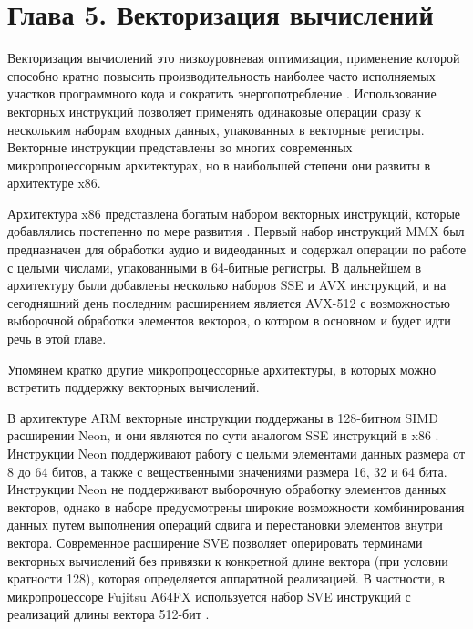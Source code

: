 \newpage
\section*{Глава 5. Векторизация вычислений} %
\addtocounter{section}{1}                                                    %
\setcounter{subsection}{0}
\setcounter{figure}{0}
\setcounter{equation}{0}
\setcounter{table}{0}
\setcounter{theorem}{0}
\setcounter{lemma}{0}
\setcounter{definition}{0}

Векторизация вычислений это низкоуровневая оптимизация, применение которой способно кратно повысить производительность наиболее часто исполняемых участков программного кода и сократить энергопотребление \cite{Cebrian2019VecScal}.
Использование векторных инструкций позволяет применять одинаковые операции сразу к нескольким наборам входных данных, упакованных в векторные регистры.
Векторные инструкции представлены во многих современных микропроцессорным архитектурах, но в наибольшей степени они развиты в архитектуре x86.

Архитектура x86 представлена богатым набором векторных инструкций, которые добавлялись постепенно по мере развития \cite{IntelSDM2025}.
Первый набор инструкций MMX был предназначен для обработки аудио и видеоданных и содержал операции по работе с целыми числами, упакованными в 64-битные регистры.
В дальнейшем в архитектуру были добавлены несколько наборов SSE и AVX инструкций, и на сегодняшний день последним расширением является AVX-512 с возможностью выборочной обработки элементов векторов, о котором в основном и будет идти речь в этой главе.

Упомянем кратко другие микропроцессорные архитектуры, в которых можно встретить поддержку векторных вычислений.

В архитектуре ARM векторные инструкции поддержаны в 128-битном SIMD расширении Neon, и они являются по сути аналогом SSE инструкций в x86 \cite{Zhuykov2012VecARM,Marquez2020VecARM}.
Инструкции Neon поддерживают работу с целыми элементами данных размера от 8 до 64 битов, а также с вещественными значениями размера 16, 32 и 64 бита.
Инструкции Neon не поддерживают выборочную обработку элементов данных векторов, однако в наборе предусмотрены широкие возможности комбинирования данных путем выполнения операций сдвига и перестановки элементов внутри вектора.
Современное расширение SVE \cite{Stephens2017VecARM} позволяет оперировать терминами векторных вычислений без привязки к конкретной длине вектора (при условии кратности 128), которая определяется аппаратной реализацией.
В частности, в микропроцессоре Fujitsu A64FX используется набор SVE инструкций с реализаций длины вектора 512-бит \cite{Okazaki2020A64FX}.

